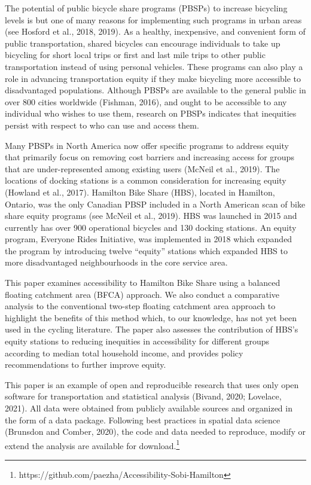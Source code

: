 \documentclass[]{elsarticle} %
\begin{document}
The potential of public bicycle share programs (PBSPs) to increase
bicycling levels is but one of many reasons for implementing such
programs in urban areas (see Hosford et al., 2018, 2019). As a healthy,
inexpensive, and convenient form of public transportation, shared
bicycles can encourage individuals to take up bicycling for short local
trips or first and last mile trips to other public transportation
instead of using personal vehicles. These programs can also play a role
in advancing transportation equity if they make bicycling more
accessible to disadvantaged populations. Although PBSPs are available to
the general public in over 800 cities worldwide (Fishman, 2016), and
ought to be accessible to any individual who wishes to use them,
research on PBSPs indicates that inequities persist with respect to who
can use and access them.

Many PBSPs in North America now offer specific programs to address
equity that primarily focus on removing cost barriers and increasing
access for groups that are under-represented among existing users
(McNeil et al., 2019). The locations of docking stations is a common
consideration for increasing equity (Howland et al., 2017). Hamilton
Bike Share (HBS), located in Hamilton, Ontario, was the only Canadian
PBSP included in a North American scan of bike share equity programs
(see McNeil et al., 2019). HBS was launched in 2015 and currently has
over 900 operational bicycles and 130 docking stations. An equity
program, Everyone Rides Initiative, was implemented in 2018 which
expanded the program by introducing twelve ``equity'' stations which
expanded HBS to more disadvantaged neighbourhoods in the core service
area.

This paper examines accessibility to Hamilton Bike Share using a
balanced floating catchment area (BFCA) approach. We also conduct a
comparative analysis to the conventional two-step floating catchment
area approach to highlight the benefits of this method which, to our
knowledge, has not yet been used in the cycling literature. The paper
also assesses the contribution of HBS's equity stations to reducing
inequities in accessibility for different groups according to median
total household income, and provides policy recommendations to further
improve equity.

This paper is an example of open and reproducible research that uses
only open software for transportation and statistical analysis (Bivand,
2020; Lovelace, 2021). All data were obtained from publicly available
sources and organized in the form of a data package. Following best
practices in spatial data science (Brunsdon and Comber, 2020), the code
and data needed to reproduce, modify or extend the analysis are
available for download.\footnote{https://github.com/paezha/Accessibility-Sobi-Hamilton}
\end{document}
